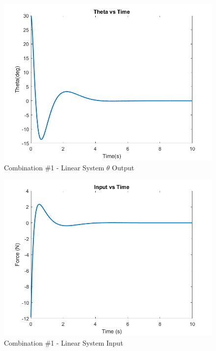 \begin{figure}[!ht]
    \centering
    \includegraphics[width=\linewidth]{figs/sf_lin_c1_theta.png}
    \caption{Combination $\#$1 - Linear System $\theta$ Output}
    \label{}
\end{figure}

\begin{figure}[!ht]
    \centering
    \includegraphics[width=\linewidth]{figs/sf_lin_c1_input.png}
    \caption{Combination $\#$1 - Linear System Input}
    \label{}
\end{figure}

